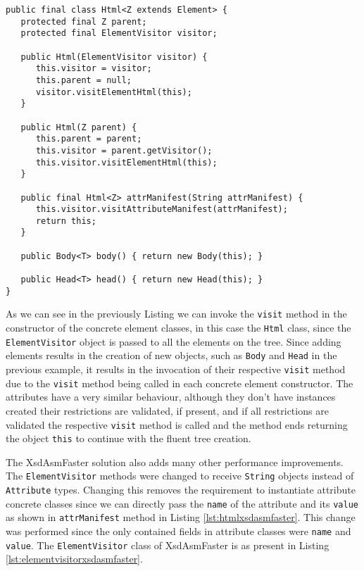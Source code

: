 \begin{minipage}{\linewidth}
\begin{lstlisting}[caption={Html class generated by XsdAsmFaster},label={lst:htmlxsdasmfaster}]
public final class Html<Z extends Element> {
   protected final Z parent;
   protected final ElementVisitor visitor;

   public Html(ElementVisitor visitor) {
      this.visitor = visitor;
      this.parent = null;
      visitor.visitElementHtml(this);
   }

   public Html(Z parent) {
      this.parent = parent;
      this.visitor = parent.getVisitor();
      this.visitor.visitElementHtml(this);
   }
   
   public final Html<Z> attrManifest(String attrManifest) {
      this.visitor.visitAttributeManifest(attrManifest);
      return this;
   }
   
   public Body<T> body() { return new Body(this); }
   
   public Head<T> head() { return new Head(this); }
}
\end{lstlisting}
\end{minipage}

\noindent
As we can see in the previously Listing we can invoke the \texttt{visit} method in the constructor of the concrete element classes, in this case the \texttt{Html} class, since the \texttt{ElementVisitor} object is passed to all the elements on the tree. Since adding elements results in the creation of new objects, such as \texttt{Body} and \texttt{Head} in the previous example, it results in the invocation of their respective \texttt{visit} method due to the \texttt{visit} method being called in each concrete element constructor. The attributes have a very similar behaviour, although they don't have instances created their restrictions are validated, if present, and if all restrictions are validated the respective \texttt{visit} method is called and the method ends returning the object \texttt{this} to continue with the fluent tree creation.

\newpage

\noindent
The XsdAsmFaster solution also adds many other performance improvements. The \texttt{ElementVisitor} methods were changed to receive \texttt{String} objects instead of \texttt{Attribute} types. Changing this removes the requirement to instantiate attribute concrete classes since we can directly pass the \texttt{name} of the attribute and its \texttt{value} as shown in \texttt{attrManifest} method in Listing \ref{lst:htmlxsdasmfaster}. This change was performed since the only contained fields in attribute classes were \texttt{name} and \texttt{value}. The \texttt{ElementVisitor} class of XsdAsmFaster is as present in Listing \ref{lst:elementvisitorxsdasmfaster}.

